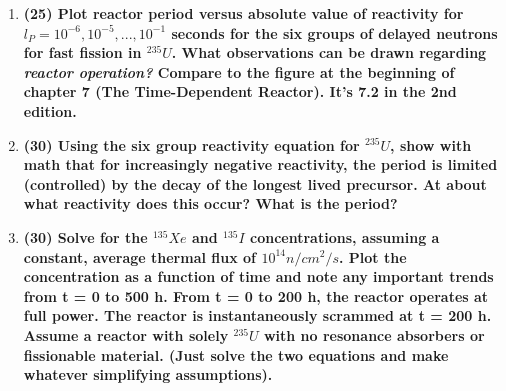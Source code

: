 \documentclass[11pt,a4paper]{article}
\begin{document}
\begin{enumerate}[leftmargin=*,topsep=0pt,font=\bfseries]
        \newpage 
    \item\textbf{(25) Plot reactor period versus absolute value of reactivity for $l_P = 10^{-6},10^{-5},...,10^{-1}$ seconds for the six groups of delayed neutrons for fast fission in $^{235}U$. What observations can be drawn regarding \textit{reactor operation?} Compare to the figure at the beginning of chapter 7 (The Time-Dependent Reactor). It's 7.2 in the 2nd edition.}
        \vspace{0.25in}\\




















        \newpage 
    \item\textbf{(30) Using the six group reactivity equation for $^{235}U$, show with math that for increasingly negative reactivity, the period is limited (controlled) by the decay of the longest lived precursor. At about what reactivity does this occur? What is the period?}
        \vspace{0.25in}\\


















        \newpage 
    \item\textbf{(30) Solve for the $^{135}Xe$ and $^{135}I$ concentrations, assuming a constant, average thermal flux of $10^{14} n/cm^2/s$. Plot the concentration as a function of time and note any important trends from t = 0 to 500 h. From t = 0 to 200 h, the reactor operates at full power. The reactor is instantaneously scrammed at t = 200 h. Assume a reactor with solely $^{235}U$ with no resonance absorbers or fissionable material. (Just solve the two equations and make whatever simplifying assumptions).}
        \vspace{0.25in}\\
























\end{enumerate}
\end{document}
